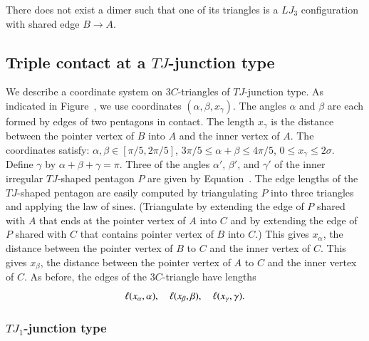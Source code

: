 There does not exist a dimer such that one of its triangles
is a $LJ_3$ configuration with shared edge $B\to A$.

\subsection{Triple contact at a $TJ$-junction type}

We describe a coordinate system on $3C$-triangles of $TJ$-junction
type.  As indicated in Figure~, we use coordinates
$(\alpha,\beta,x_\gamma)$.  The angles $\alpha$ and $\beta$ are each
formed by edges of two pentagons in contact.  The length $x_\gamma$ is
the distance between the pointer vertex of $B$ into $A$ and the inner
vertex of $A$.  The coordinates satisfy:
$\alpha,\beta\in[\pi/5,2\pi/5]$, $3\pi/5\le \alpha+\beta\le 4\pi/5$,
$0\le x_\gamma\le 2\sigma$.  Define $\gamma$ by
$\alpha+\beta+\gamma=\pi$.  Three of the angles $\alpha'$, $\beta'$,
and $\gamma'$ of the inner irregular $TJ$-shaped pentagon $P$ are
given by Equation~.  The edge lengths of the $TJ$-shaped
pentagon are easily computed by triangulating $P$ into three triangles
and applying the law of sines.  (Triangulate by extending the edge of
$P$ shared with $A$ that ends at the pointer vertex of $A$ into $C$
and by extending the edge of $P$ shared with $C$ that contains pointer
vertex of $B$ into $C$.)  This gives $x_\alpha$, the distance between
the pointer vertex of $B$ to $C$ and the inner vertex of $C$.  This
gives $x_\beta$, the distance between the pointer vertex of $A$ to $C$
and the inner vertex of $C$.  As before, the edges of the
$3C$-triangle have lengths
\[
\ell(x_\alpha,\alpha),\quad \ell(x_\beta,\beta),\quad \ell(x_\gamma,\gamma).
\]


\subsubsection{$TJ_1$-junction type}

